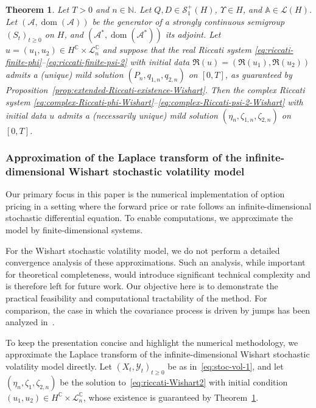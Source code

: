 \documentclass[10pt,a4paper,reqno]{amsart}
\DeclareMathOperator\dom{dom}
\numberwithin{equation}{section}
\newtheorem{theorem}{Theorem}[section]
\theoremstyle{plain}
\theoremstyle{definition}
\theoremstyle{example}
\newcommand{\cA}{\mathcal{A}}
\newcommand{\cL}{\mathcal{L}}
\newcommand{\cY}{\mathcal{Y}}
\newcommand{\cS}{\mathcal{S}}
\begin{document}
\begin{theorem}\label{thm:extended-affine-Z}
Let $T>0$ and $n\in\mathbb{N}$. Let $Q,D\in\cS_1^+(H)$, $\Upsilon\in H$, and $\mathbb{A}\in\cL(H)$. 
Let $(\cA,\dom(\cA))$ be the generator of a strongly continuous semigroup $(S_t)_{t\ge0}$ on $H$, 
and $(\cA^*,\dom(\cA^*))$ its adjoint. 
Let $u=(u_1,u_2)\in H^\mathbb{C}\times\cL_n^{\mathbb{C}}$ and suppose that the \emph{real} Riccati system
\eqref{eq:riccati-finite-phi}--\eqref{eq:riccati-finite-psi-2} with initial data $\Re(u)=(\Re(u_1),\Re(u_2))$ 
admits a (unique) mild solution $(P_n,q_{1,n},q_{2,n})$ on $[0,T]$, as guaranteed by 
Proposition~\ref{prop:extended-Riccati-existence-Wishart}. Then the \emph{complex} Riccati system 
\eqref{eq:complex-Riccati-phi-Wishart}--\eqref{eq:complex-Riccati-psi-2-Wishart} with initial data $u$ 
admits a (necessarily unique) mild solution $(\eta_n,\zeta_{1,n},\zeta_{2,n})$ on $[0,T]$.
\end{theorem}

 
\subsubsection{Approximation of the Laplace transform of the infinite-dimensional Wishart stochastic volatility model} 

Our primary focus in this paper is the numerical implementation of option pricing in a setting where the forward price or rate follows an infinite-dimensional stochastic differential equation. To enable computations, we approximate the model by finite-dimensional systems.  

For the Wishart stochastic volatility model, we do not perform a detailed convergence analysis of these approximations. Such an analysis, while important for theoretical completeness, would introduce significant technical complexity and is therefore left for future work.  
Our objective here is to demonstrate the practical feasibility and computational tractability of the method. For comparison, the case in which the covariance process is driven by jumps has been analyzed in~\cite{Kar24,Kar25}.

To keep the presentation concise and highlight the numerical methodology, we approximate the Laplace transform of the infinite-dimensional Wishart stochastic volatility model directly.  
Let $(X_t, \cY_t)_{t \geq 0}$ be as in~\eqref{eq:stoc-vol-1}, and let $(\eta_n, \zeta_1, \zeta_{2,n})$ be the solution to~\eqref{eq:riccati-Wishart2} with initial condition $(u_1, u_2) \in H^{\mathbb{C}} \times \cL_n^{\mathbb{C}}$, whose existence is guaranteed by Theorem~\ref{thm:extended-affine-Z}.  
\end{document}
